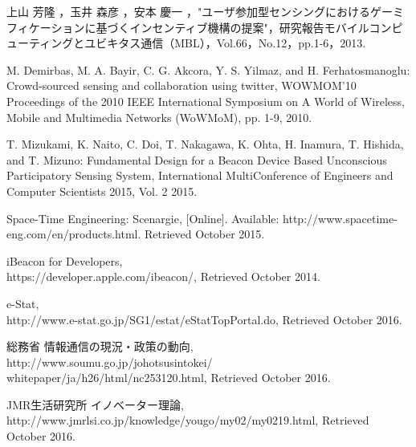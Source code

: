 \documentclass[submit,techrep]{ipsj}
\begin{document}
\begin{thebibliography}{10}


上山 芳隆 ，玉井 森彦 ，安本 慶一 ，"ユーザ参加型センシングにおけるゲーミフィケーションに基づくインセンティブ機構の提案"，研究報告モバイルコンピューティングとユビキタス通信（MBL），Vol.66，No.12，pp.1-6，2013.

M. Demirbas, M. A. Bayir, C. G. Akcora, Y. S. Yilmaz, and H. Ferhatosmanoglu:
Crowd-sourced sensing and collaboration using twitter,
WOWMOM'10 Proceedings of the 2010 IEEE International Symposium on A World of Wireless, Mobile and Multimedia Networks (WoWMoM),
pp. 1-9, 2010.

T. Mizukami, K. Naito, C. Doi, T. Nakagawa, K. Ohta, H. Inamura, T. Hishida, and T. Mizuno:
Fundamental Design for a Beacon Device Based Unconscious Participatory Sensing System,
International MultiConference of Engineers and Computer Scientists 2015, Vol. 2 2015.

Space-Time Engineering: Scenargie, [Online]. Available: http://www.spacetime-eng.com/en/products.html. Retrieved October 2015.

iBeacon for Developers,\\https://developer.apple.com/ibeacon/,
Retrieved October 2014.

e-Stat,\\http://www.e-stat.go.jp/SG1/estat/eStatTopPortal.do,
Retrieved October 2016.

総務省 情報通信の現況・政策の動向,\\
http://www.soumu.go.jp/johotsusintokei/\\
whitepaper/ja/h26/html/nc253120.html,
Retrieved October 2016.

JMR生活研究所 イノベーター理論,\\
http://www.jmrlsi.co.jp/knowledge/yougo/my02/my0219.html,
Retrieved October 2016.


\end{thebibliography}
\end{document}
